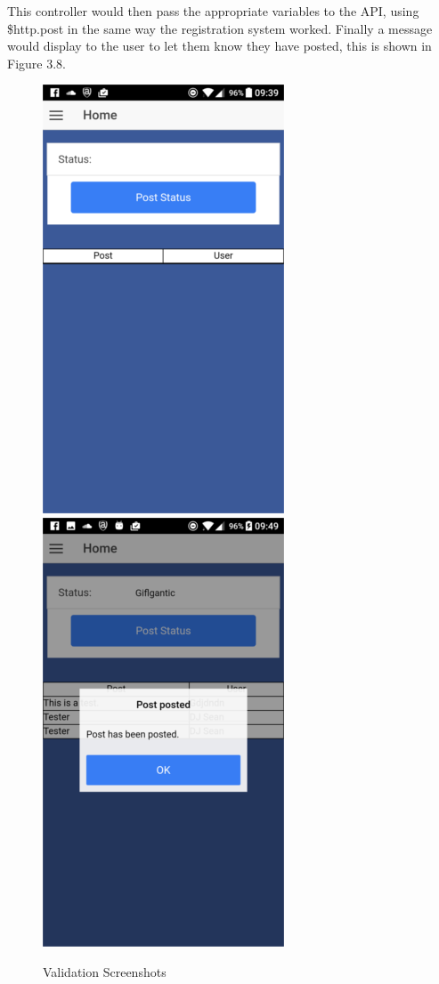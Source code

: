 This controller would then pass the appropriate variables to the API, using \$http.post in the same way the registration system worked. Finally a message would display to the user to let them know they have posted, this is shown in Figure 3.8.
\begin{center}
\begin{figure}[H]
\includegraphics[scale=0.5]{images/sc10}
\includegraphics[scale=0.5]{images/sc11}
\caption{Validation Screenshots}
\end{figure}
\end{center}

